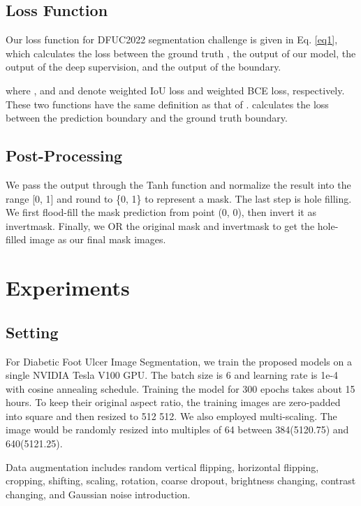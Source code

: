 \documentclass[runningheads]{llncs}
\begin{document}
\subsection{Loss Function}

Our loss function for DFUC2022 segmentation challenge
is given in Eq. \eqref{eq1},
  which calculates the loss between the ground truth ,
  the output  of our model,
  the output  of the deep supervision, and
  the output  of the boundary.
  
  where , and  and  denote
  weighted IoU loss and weighted BCE loss, respectively.
  These two functions have the same definition as that of \cite{f3net}.
   calculates the loss between
  the prediction boundary and the ground truth boundary.

\subsection{Post-Processing}

We pass the output through
the Tanh function and
normalize the result into the range [0, 1] and round to \{0, 1\} to represent a mask.
The last step is hole filling.
We first flood-fill the mask prediction from point (0, 0), then invert it as invertmask.
Finally, we OR the original mask and invertmask to get the hole-filled image as our final mask images.

\section{Experiments}

\subsection{Setting}

For Diabetic Foot Ulcer Image Segmentation, we train the proposed models on
a single NVIDIA Tesla V100 GPU.
The batch size is 6
and learning rate is 1e-4 with cosine annealing schedule.
Training the model for 300 epochs takes about 15 hours.
To keep their original aspect ratio,
the training images are zero-padded into square and
then resized to 512  512.
We also employed multi-scaling.
The image would be randomly resized into multiples of 64
between 384(5120.75) and 640(5121.25).

Data augmentation includes random vertical flipping,
horizontal flipping, cropping, shifting, scaling, rotation, coarse dropout, brightness changing, contrast changing, and Gaussian noise introduction.
\end{document}
